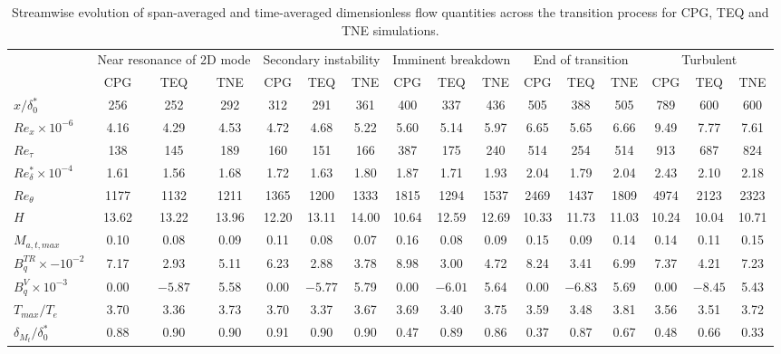 \newpage
\begin{table}
\centering
\caption{Streamwise evolution of span-averaged and time-averaged dimensionless flow quantities across the transition process for 
CPG, TEQ and TNE simulations.}
\begin{tabular}{lccc ccc ccc ccc ccc}
\toprule
 & \multicolumn{3}{c}{Near resonance of 2D mode} 
 & \multicolumn{3}{c}{Secondary instability} 
 & \multicolumn{3}{c}{Imminent breakdown} 
 & \multicolumn{3}{c}{End of transition} 
 & \multicolumn{3}{c}{Turbulent} \\
\cmidrule(lr){2-4} \cmidrule(lr){5-7} \cmidrule(lr){8-10} \cmidrule(lr){11-13} \cmidrule(lr){14-16}
 & CPG & TEQ & TNE & CPG & TEQ & TNE & CPG & TEQ & TNE & CPG & TEQ & TNE & CPG & TEQ & TNE \\
\midrule
$x/\delta^*_0$ & 256 & 252 & 292 & 312 & 291 & 361 & 400 & 337 & 436 & 505 & 388 & 505 & 789 & 600 & 600 \\
$Re_x \times 10^{-6}$ & 4.16 & 4.29 & 4.53 & 4.72 & 4.68 & 5.22 & 5.60 & 5.14 & 5.97 & 6.65 & 5.65 & 6.66 & 9.49 & 7.77 & 7.61 \\
$Re_\tau$ & 138 & 145 & 189 & 160 & 151 & 166 & 387 & 175 & 240 & 514 & 254 & 514 & 913 & 687 & 824 \\
$Re^*_\delta \times 10^{-4}$ & 1.61 & 1.56 & 1.68 & 1.72 & 1.63 & 1.80 & 1.87 & 1.71 & 1.93 & 2.04 & 1.79 & 2.04 & 2.43 & 2.10 & 2.18 \\
$Re_\theta$ & 1177 & 1132 & 1211 & 1365 & 1200 & 1333 & 1815 & 1294 & 1537 & 2469 & 1437 & 1809 & 4974 & 2123 & 2323 \\
$H$ & 13.62 & 13.22 & 13.96 & 12.20 & 13.11 & 14.00 & 10.64 & 12.59 & 12.69 & 10.33 & 11.73 & 11.03 & 10.24 & 10.04 & 10.71 \\
$M_{a,t,max}$ & 0.10 & 0.08 & 0.09 & 0.11 & 0.08 & 0.07 & 0.16 & 0.08 & 0.09 & 0.15 & 0.09 & 0.14 & 0.14 & 0.11 & 0.15 \\
$B_q^{TR}  \times -10^{-2}$ & 7.17 & 2.93 & 5.11 & 6.23 & 2.88 & 3.78 & 8.98 & 3.00 & 4.72 & 8.24 & 3.41 & 6.99 & 7.37 & 4.21 & 7.23 \\
$B_q^{V} \times 10^{-3}$ & 0.00 & $-5.87$ & 5.58 & 0.00 & $-5.77$ & 5.79 & 0.00 & $-6.01$ & 5.64 & 0.00 & $-6.83$ & 5.69 & 0.00 & $-8.45$ & 5.43 \\
$T_{max}/T_e$ & 3.70 & 3.36 & 3.73 & 3.70 & 3.37 & 3.67 & 3.69 & 3.40 & 3.75 & 3.59 & 3.48 & 3.81 & 3.56 & 3.51 & 3.72 \\
$\delta_{M_t}/\delta^{*}_{0}$ & 0.88 & 0.90 & 0.90 & 0.91 & 0.90 & 0.90 & 0.47 & 0.89 & 0.86 & 0.37 & 0.87 & 0.67 & 0.48 & 0.66 & 0.33 \\

\end{tabular}
\end{table}
